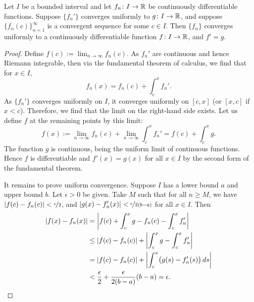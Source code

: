 \begin{thm} \label{thm:dersconverge}
Let $I$ be a bounded interval and let
$f_n \colon I \to {\mathbb{R}}$ be continuously differentiable functions.
Suppose $\{ f_n' \}$ converges uniformly to $g \colon I \to {\mathbb{R}}$,
and suppose $\bigl\{ f_n(c) \bigr\}_{n=1}^\infty$ is a
convergent sequence for some $c \in I$.  Then $\{ f_n \}$ converges uniformly to 
a continuously differentiable function $f \colon I \to {\mathbb{R}}$, and $f' = g$.
\end{thm}

\begin{proof}
Define $f(c) := \lim_{n\to \infty} f_n(c)$.
As $f_n'$ are continuous and hence Riemann integrable,
then
via the fundamental theorem of calculus, we find that for $x \in I$,
\begin{equation*}
f_n(x) = f_n(c) + \int_c^x f_n' .
\end{equation*}
As $\{ f_n' \}$ converges uniformly on $I$, it converges uniformly
on $[c,x]$ (or $[x,c]$ if $x < c$).
Therefore, we find that the limit on the right-hand side exists.
Let us define $f$ at the remaining points by this limit:
\begin{equation*}
f(x) :=
\lim_{n\to\infty} f_n(c) + \lim_{n\to\infty} \int_c^x f_n'
=
f(c) + \int_c^x g .
\end{equation*}
The function $g$ is continuous, being the uniform limit of continuous
functions.  Hence $f$ is differentiable and $f'(x) = g(x)$ for all $x \in I$
by the second form of the fundamental theorem.

It remains to prove
uniform convergence.
Suppose $I$ has a lower bound $a$ and upper bound $b$.
Let $\epsilon > 0$ be given.  Take $M$
such that for all $n \geq M$, we have
$\left\lvert {f(c)-f_n(c)} \right\rvert < \nicefrac{\epsilon}{2}$,
and
$\left\lvert {g(x)-f_n'(x)} \right\rvert < \nicefrac{\epsilon}{2(b-a)}$
for all $x \in I$.  Then
\begin{equation*}
\begin{split}
\left\lvert {f(x) - f_n(x)} \right\rvert & =
\left\lvert {f(c) + \int_c^x g - f_n(c) - \int_c^x f_n'} \right\rvert
\\
& \leq
\left\lvert {f(c) - f_n(c)} \right\rvert + \left\lvert {\int_c^x g - \int_c^x f_n'} \right\rvert
\\
& =
\left\lvert {f(c) - f_n(c)} \right\rvert + \left\lvert {\int_c^x \bigl(g(s) - f_n'(s)\bigr) \, ds} \right\rvert
\\
& <
\frac{\epsilon}{2}
+
\frac{\epsilon}{2(b-a)}
(b-a)
=\epsilon. \qedhere
\end{split}
\end{equation*}
\end{proof}


